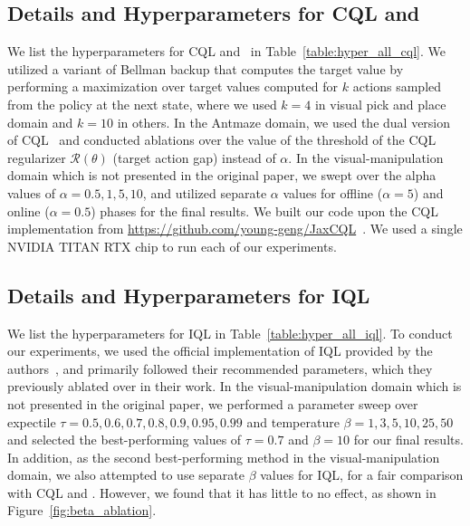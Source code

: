 \subsection{Details and Hyperparameters for CQL and \methodname\ }
We list the hyperparameters for CQL and \methodname\ in Table~\ref{table:hyper_all_cql}. We utilized a variant of Bellman backup that computes the target value by performing a maximization over target values computed for $k$ actions sampled from the policy at the next state, where we used $k=4$ in visual pick and place domain and $k=10$ in others. In the Antmaze domain, we used the dual version of CQL~\citep{kumar2020conservative} and conducted ablations over the value of the threshold of the CQL regularizer $\mathcal{R}(\theta)$ (target action gap) instead of $\alpha$. In the visual-manipulation domain which is not presented in the original paper, we swept over the alpha values of $\alpha=0.5, 1, 5, 10$, and utilized separate $\alpha$ values for offline ($\alpha=5$) and online ($\alpha=0.5$) phases for the final results. We built our code upon the CQL implementation from \url{https://github.com/young-geng/JaxCQL}~\cite{geng2022jaxcql}. We used a single NVIDIA TITAN RTX chip to run each of our experiments.

\subsection{Details and Hyperparameters for IQL}
We list the hyperparameters for IQL in Table~\ref{table:hyper_all_iql}. To conduct our experiments, we used the official implementation of IQL provided by the authors~\citep{kostrikov2021iql}, and primarily followed their recommended parameters, which they previously ablated over in their work. In the visual-manipulation domain which is not presented in the original paper, we performed a parameter sweep over expectile $\tau = 0.5, 0.6, 0.7, 0.8, 0.9, 0.95, 0.99$ and temperature $\beta = 1, 3, 5, 10, 25, 50$ and selected the best-performing values of $\tau = 0.7$ and $\beta = 10$ for our final results. In addition, as the second best-performing method in the visual-manipulation domain, we also attempted to use separate $\beta$ values for IQL, for a fair comparison with CQL and \methodname. However, we found that it has little to no effect, as shown in Figure~\ref{fig:beta_ablation}. 

